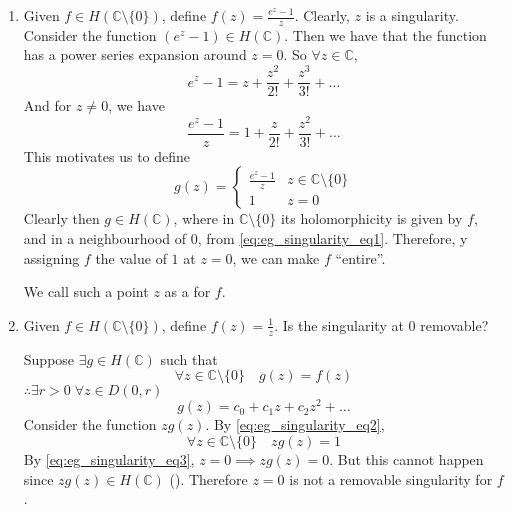 \documentclass[11pt, oneside]{book}
\begin{document}
\begin{eg}
	\begin{enumerate}
		\item Given $f \in H(\mathbb{C} \setminus \{0\})$, define $f(z) = \frac{e^z - 1}{z}$. Clearly, $z$ is a singularity. Consider the function $(e^z - 1) \in H(\mathbb{C})$. Then we have that the function has a power series expansion around $z = 0$. So $\forall z \in \mathbb{C}$,
		\begin{equation*}
			e^z - 1 = z + \frac{z^2}{2!} + \frac{z^3}{3!} + \hdots
		\end{equation*}
		And for $z \neq 0$, we have
		\begin{equation}\label{eq:eg_singularity_eq1}
			\frac{e^z - 1}{z} = 1 + \frac{z}{2!} + \frac{z^2}{3!} + \hdots
		\end{equation}
		This motivates us to define
		\begin{equation*}
			g(z) = \begin{cases}
				\frac{e^z - 1}{z} 	& z \in \mathbb{C} \setminus \{0\} \\
				1					& z = 0
			\end{cases}
		\end{equation*}
		Clearly then $g \in H(\mathbb{C})$, where in $\mathbb{C} \setminus \{0\}$ its holomorphicity is given by $f$, and in a neighbourhood of $0$, from \cref{eq:eg_singularity_eq1}. Therefore, y assigning $f$ the value of $1$ at $z = 0$, we can make $f$ ``entire''.

		We call such a point $z$ as a  for $f$.

		\item Given $f \in H(\mathbb{C} \setminus \{0\})$, define $f(z) = \frac{1}{z}$. Is the singularity at $0$ removable?

		Suppose $\exists g \in H(\mathbb{C})$ such that
		\begin{equation}\label{eq:eg_singularity_eq2}
			\forall z \in \mathbb{C} \setminus \{0\} \quad g(z) = f(z)
		\end{equation}
		$\therefore \exists r > 0 \; \forall z \in D(0, r)$
		\begin{equation}\label{eq:eg_singularity_eq3}
			g(z) = c_0 + c_1 z + c_2 z^2 + \hdots
		\end{equation}
		Consider the function $zg(z)$. By \cref{eq:eg_singularity_eq2},
		\begin{equation*}
			\forall z \in \mathbb{C} \setminus \{0\} \quad zg(z) = 1
		\end{equation*}
		By \cref{eq:eg_singularity_eq3}, $z = 0 \implies zg(z) = 0$. But this cannot happen since $zg(z) \in H(\mathbb{C})$ (). Therefore $z = 0$ is not a removable singularity for $f$.
	\end{enumerate}
\end{eg}
\end{document}
